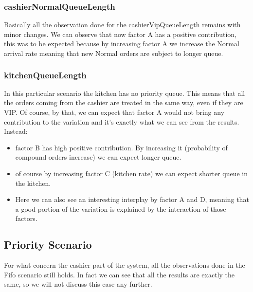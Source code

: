 \subsubsection{cashierNormalQueueLength}


Basically all the observation done for the cashierVipQueueLength remains with minor changes. We can observe that now factor A has a positive contribution, this was to be expected because by increasing factor A we increase the Normal arrival rate meaning that new Normal orders are subject to longer queue.

\subsubsection{kitchenQueueLength}



In this particular scenario the kitchen has no priority queue. This means that all the orders coming from the cashier are treated in the same way, even if they are VIP. Of course, by that, we can expect that factor A would not bring any contribution to the variation and it's exactly what we can see from the results. Instead:
\begin{itemize}
    \item factor B has high positive contribution. By increasing it (probability of compound orders increase) we can expect longer queue.
    \item of course by increasing factor C (kitchen rate) we can expect shorter queue in the kitchen.
    \item Here we can also see an interesting interplay by factor A and D, meaning that a good portion of the variation is explained by the interaction of those factors.
\end{itemize}


\subsection{Priority Scenario}

For what concern the cashier part of the system, all the observations done in the Fifo scenario still holds. In fact we can see that all the results are exactly the same, so we will not discuss this case any further.


